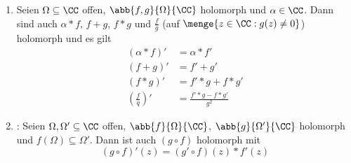 \begin{bemerkung}
	\begin{enumerate}[label=(\arabic*)]
		\item Seien $\Omega \subseteq \CC$ offen, $\abb{f,g}{\Omega}{\CC}$ holomorph und $\alpha \in \CC$. Dann sind auch $\alpha * f$, $f+g$, $f*g$ und $\frac{f}{g}$ (auf $\menge{z \in \CC : g(z) \neq 0}$) holomorph und es gilt
		\begin{subequations}
			\begin{align}
				(\alpha * f)' &= \alpha * f' \\
				(f+g)' &= f' + g' \\
				(f*g)' &= f' * g + f * g' \\
				(\frac{f}{q})' &= \frac{f'*g - f*g'}{g^2}
 			\end{align}
		\end{subequations}
		\item {}: Seien $\Omega, \Omega' \subseteq \CC$ offen, $\abb{f}{\Omega}{\CC}$, $\abb{g}{\Omega'}{\CC}$ holomorph und $f(\Omega) \subseteq \Omega'$. Dann ist auch $(g \circ f)$ holomorph mit
		\begin{equation}
			(g \circ f)'(z) = (g' \circ f)(z) * f'(z)
		\end{equation}
	\end{enumerate}
\end{bemerkung}